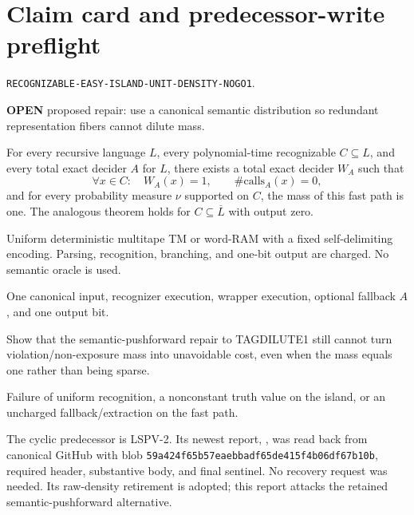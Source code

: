 \documentclass[11pt]{article}
\newcommand{\OPEN}{\textbf{OPEN}}
\newcommand{\same}{\textsc{same\_realization}}
\begin{document}
\section{Claim card and predecessor-write preflight}
\begin{description}[leftmargin=0cm,labelwidth=0cm]
\item[Claim ID.] \texttt{RECOGNIZABLE-EASY-ISLAND-UNIT-DENSITY-NOGO1}.
\item[Status before run.] \OPEN{} proposed repair: use a canonical semantic
distribution so redundant representation fibers cannot dilute mass.
\item[Exact prefix.] For every recursive language \(L\), every
polynomial-time recognizable \(C\subseteq L\), and every total exact decider
\(A\) for \(L\), there exists a total exact decider \(W_A\) such that
\[
 \forall x\in C:\quad W_A(x)=1,\qquad
 \#\mathrm{calls}_A(x)=0,                               \tag{1}
\]
and for every probability measure \(\nu\) supported on \(C\), the mass of
this fast path is one. The analogous theorem holds for
\(C\subseteq\overline L\) with output zero.
\item[Model.] Uniform deterministic multitape TM or word-RAM with a fixed
self-delimiting encoding. Parsing, recognition, branching, and one-bit output
are charged. No semantic oracle is used.
\item[\same{} objects.] One canonical input, recognizer execution, wrapper
execution, optional fallback \(A\), and one output bit.
\item[Weakest advance.] Show that the semantic-pushforward repair to
TAGDILUTE1 still cannot turn violation/non-exposure mass into unavoidable
cost, even when the mass equals one rather than being sparse.
\item[What would falsify it.] Failure of uniform recognition, a nonconstant
truth value on the island, or an uncharged fallback/extraction on the fast
path.
\end{description}

The cyclic predecessor is LSPV-2. Its newest report,
,
was read back from canonical GitHub with blob
\texttt{59a424f65b57eaebbadf65de415f4b06df67b10b}, required header, substantive
body, and final sentinel. No recovery request was needed. Its raw-density
retirement is adopted; this report attacks the retained semantic-pushforward
alternative.
\end{document}

